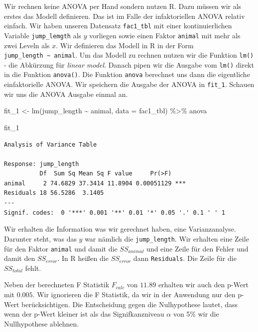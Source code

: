 \documentclass[
  letterpaper,
  DIV=11,
  oneside]{scrreport}
\newenvironment{Shaded}{\begin{snugshade}}{\end{snugshade}}
\newcommand{\AttributeTok}[1]{\textcolor[rgb]{0.40,0.45,0.13}{#1}}
\newcommand{\FunctionTok}[1]{\textcolor[rgb]{0.28,0.35,0.67}{#1}}
\newcommand{\NormalTok}[1]{\textcolor[rgb]{0.00,0.23,0.31}{#1}}
\newcommand{\OtherTok}[1]{\textcolor[rgb]{0.00,0.23,0.31}{#1}}
\newcommand{\SpecialCharTok}[1]{\textcolor[rgb]{0.37,0.37,0.37}{#1}}
\begin{document}
Wir rechnen keine ANOVA per Hand sondern nutzen R. Dazu müssen wir als
erstes das Modell definieren. Das ist im Falle der infaktoriellen ANOVA
relativ einfach. Wir haben unseren Datensatz \texttt{fac1\_tbl} mit
einer kontinuierlichen Variable \texttt{jump\_lemgth} als \(y\)
vorliegen sowie einen Faktor \texttt{animal} mit mehr als zwei Leveln
als \(x\). Wir definieren das Modell in R in der Form
\texttt{jump\_length\ \textasciitilde{}\ animal}. Um das Modell zu
rechnen nutzen wir die Funktion \texttt{lm()} - die Abkürzung für
\emph{linear model}. Danach pipen wir die Ausgabe vom \texttt{lm()}
direkt in die Funktion \texttt{anova()}. Die Funktion \texttt{anova}
berechnet uns dann die eigentliche einfaktorielle ANOVA. Wir speichern
die Ausgabe der ANOVA in \texttt{fit\_1}. Schauen wir uns die ANOVA
Ausgabe einmal an.

\begin{Shaded}
\begin{Highlighting}[]
\NormalTok{fit\_1 }\OtherTok{\textless{}{-}}  \FunctionTok{lm}\NormalTok{(jump\_length }\SpecialCharTok{\textasciitilde{}}\NormalTok{ animal, }\AttributeTok{data =}\NormalTok{ fac1\_tbl) }\SpecialCharTok{\%\textgreater{}\%} 
\NormalTok{  anova}

\NormalTok{fit\_1}
\end{Highlighting}
\end{Shaded}

\begin{verbatim}
Analysis of Variance Table

Response: jump_length
          Df  Sum Sq Mean Sq F value     Pr(>F)    
animal     2 74.6829 37.3414 11.8904 0.00051129 ***
Residuals 18 56.5286  3.1405                       
---
Signif. codes:  0 '***' 0.001 '**' 0.01 '*' 0.05 '.' 0.1 ' ' 1
\end{verbatim}

Wir erhalten die Information was wir gerechnet haben, eine
Varianzanalyse. Darunter steht, was das \(y\) war nämlich die
\texttt{jump\_length}. Wir erhalten eine Zeile für den Faktor
\texttt{animal} und damit die \(SS_{animal}\) und eine Zeile für den
Fehler und damit den \(SS_{error}\). In R heißen die \(SS_{error}\) dann
\texttt{Residuals}. Die Zeile für die \(SS_{total}\) fehlt.

Neben der berechneten F Statistik \(F_{calc}\) von \(11.89\) erhalten
wir auch den p-Wert mit \(0.005\). Wir ignorieren die F Statistik, da
wir in der Anwendung nur den p-Wert berücksichtigen. Die Entscheidung
gegen die Nulhypothese lautet, dass wenn der p-Wert kleiner ist als das
Signifkanzniveau \(\alpha\) von 5\% wir die Nullhypothese ablehnen.
\end{document}

